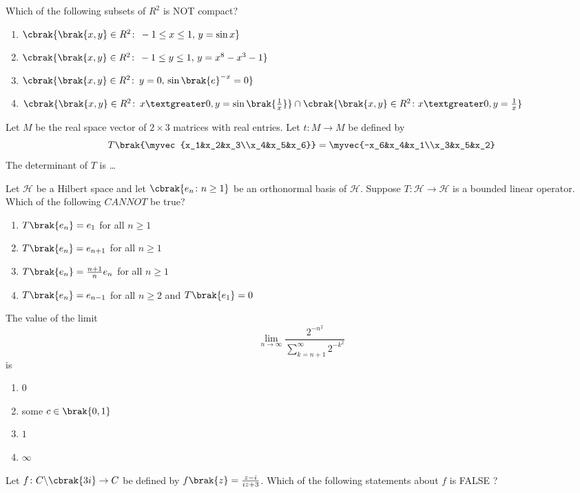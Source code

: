     \item Which of the following subsets of $R^2$ is NOT compact?
    \begin{enumerate}
        \item $\cbrak{\brak{x,y}\in R^2\colon\,-1\leq x\leq1,\,y=\sin x}$
        \item $\cbrak{\brak{x,y}\in R^2\colon\,-1\leq y\leq1,\,y=x^8-x^3-1}$
        \item $\cbrak{\brak{x,y}\in R^2\colon\,y=0,\,\sin\brak{e}^{-x}=0}$
        \item $\cbrak{\brak{x,y}\in R^2\colon\, x\textgreater 0,y=\sin\brak{\frac{1}{x}}}\cap\cbrak{\brak{x,y}\in R^2\colon x\textgreater0,y=\frac{1}{x}}$
    \end{enumerate}
    \item Let $M$ be the real space vector of $2\times3$ matrices with real entries. Let $t\colon M\to M$ be defined by
    $$T\brak{\myvec{x_1&x_2&x_3\\x_4&x_5&x_6}}=\myvec{-x_6&x_4&x_1\\x_3&x_5&x_2}$$
    The determinant of $T$ is \dots
    \item Let $\mathcal{H}$ be a Hilbert space and let $\cbrak{e_n\colon n\geq1}$ be an orthonormal basis of $\mathcal{H}$. Suppose $T\colon\mathcal{H}\to \mathcal{H}$ is a bounded linear operator. Which of the following $CANNOT$ be true?
     \begin{enumerate}
        \item $T\brak{e_n}= e_1$ for all $n\geq1$
        \item $T\brak{e_n}= e_{n+1}$ for all $n\geq1$
        \item $T\brak{e_n}= \frac{n+1}{n}e_n$ for all $n\geq1$
        \item $T\brak{e_n}= e_{n-1}$ for all $n\geq2$ and $T\brak{e_1}=0$
    \end{enumerate}
    \item The value of the limit 
            $$\lim_{n\to\infty}\frac{2^{-n^2}}{\sum_{k=n+1}^{\infty}2^{-k^2}}$$
            is
        \begin{enumerate}
            \item $0$
            \item some $c\in \brak{0,1}$
            \item $1$
            \item $\infty$
        \end{enumerate}
    \item Let $f\colon C\backslash \cbrak{3i}\to C$ be defined by $f\brak{z}=\frac{z-i}{iz+3}$. Which of the following statements about $f$ is FALSE ?
